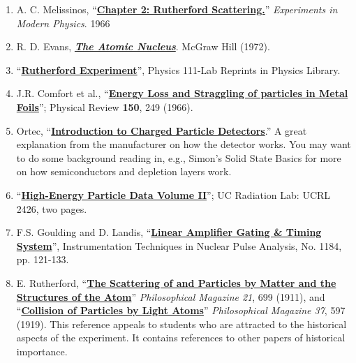 \documentclass{../lab}
\begin{document}
\begin{enumerate}
    \item A. C. Melissinos, ``\href{https://drive.google.com/file/d/1XUpk_MVeLUhutm548PpIWOzJOl3SFZqI/view?usp=drive_link}{\textbf{Chapter 2: Rutherford Scattering.}}'' \emph{Experiments in Modern Physics}. 1966

    \item R. D. Evans, \href{https://drive.google.com/file/d/1dHgK8gXV5EruHZoahXIMxdXk2cJ6jTod/view?usp=drive_link}{\textbf{\emph{The Atomic Nucleus}}}. McGraw Hill (1972).

    \item ``\href{https://drive.google.com/file/d/1SBZ0aXgsMzJ-81uP0l1_A_FqYBhxzONj/view?usp=drive_link}{\textbf{Rutherford Experiment}}'', Physics 111-Lab Reprints in Physics Library.

    \item J.R. Comfort et al., ``\href{https://drive.google.com/file/d/1HiGED3QV1r7E5Azw2z5a_h24YGiXcGYJ/view?usp=drive_link}{\textbf{Energy Loss and Straggling of \textalpha{} particles in Metal Foils}}''; Physical Review \textbf{150}, 249 (1966). 

    \item Ortec, ``\href{https://berkeley-physics111b.github.io/assets/pdf/oldwebsitestructure/pdfs/Introduction%20to%20Charged%20Particle%20Detectors-1.pdf}{\textbf{Introduction to Charged Particle Detectors}}.'' A great explanation from the manufacturer on how the detector works. You may want to do some background reading in, e.g., Simon's Solid State Basics for more on how semiconductors and depletion layers work.

    \item
    ``\href{https://drive.google.com/file/d/196AL2-3DE3iMRW9_TVSsGX4ZBztANAKO/view?usp=drive_link}{\textbf{High-Energy Particle Data Volume II}}''; UC Radiation Lab: UCRL 2426, two pages.

    \item F.S. Goulding and D. Landis, ``\href{https://drive.google.com/file/d/1m9gi5aTTzwajrG2pGHecgcZrJxuYaN_N/view?usp=drive_link}{\textbf{Linear Amplifier Gating \& Timing System}}'', Instrumentation Techniques in Nuclear Pulse Analysis, No. 1184, pp. 121-133.

    \item E. Rutherford, ``\href{https://drive.google.com/file/d/13a_QZvOAOaO_8JW3WzF-CiijK-Ihhj-N/view?usp=drive_link}{\textbf{The Scattering of \textalpha{}  and \textbeta{} Particles by Matter and the Structures of the Atom}}'' \emph{Philosophical Magazine 21}, 699 (1911), and ``\href{https://drive.google.com/file/d/1fmdlR8A3DeJ3uDR9-17QqGRd7ZXaDffF/view?usp=drive_link}{\textbf{Collision of  \textalpha{} Particles by Light Atoms}}'' \emph{Philosophical Magazine 37}, 597 (1919). This reference appeals to students who are attracted to the historical aspects of the experiment. It contains references to other papers of historical importance.

\end{enumerate}
\end{document}
